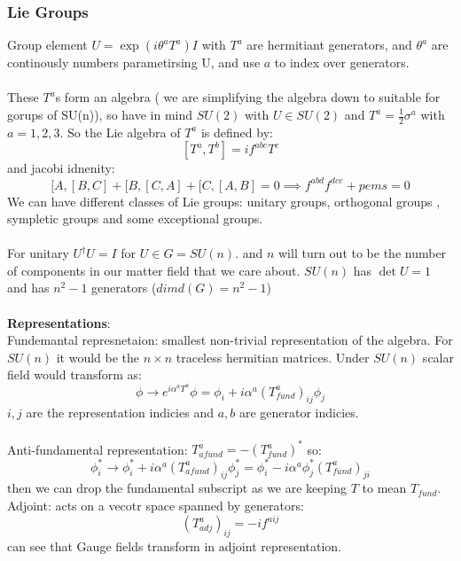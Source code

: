 \documentclass{article}
\begin{document}
\subsubsection{Lie Groups}
       Group element $U = \exp ( i \theta^a T^a) I$ with $T^a$ are hermitiant generators, and $\theta^a$ are continously numbers parametirsing U, and use $a$ to index over generators.\\\\
       These $T^a$s form an algebra ( we are simplifying the algebra down to suitable for gorups of SU(n)), so have in mind $SU(2)$ with $U \in SU(2)$ and $T^a = \frac{1}{2} \sigma^a$ with $a = 1,2,3$. So the Lie algebra of $T^a$ is defined by:
       $$
        [T^a, T^b] = i f^{abc} T^c
       $$
       and jacobi idnenity:
       $$
       [ A, [B,C] + [ B, [C,A] + [ C, [A, B] = 0 \implies f^{abd} f^{dc e} + pems = 0
       $$
       We can have different classes of Lie groups: unitary groups, orthogonal groups , sympletic groups and some exceptional groups.\\\\
       For unitary $U^{\dagger} U = I$ for $U \in G = SU(n)$. and $n$ will turn out to be the number of components in our matter field that we care about. $SU(n)$ has $\det U = 1$ and has $n^2 -1$ generators  ($dim d(G) = n^2 -1$)\\\\
       \textbf{Representations}:\\
       Fundemantal represnetaion: smallest non-trivial representation of the algebra. For $SU(n)$ it would be the $n \times n$ traceless hermitian matrices. Under $SU(n)$ scalar field would transform as:
       $$
       \phi \rightarrow e^{i \alpha^a T^a} \phi = \phi_i + i \alpha^a (T^a_{fund})_{ij} \phi_j
       $$
       $i,j$ are the representation indicies and $a,b$ are generator indicies.\\\\
       Anti-fundamental representation: $T_{afund}^a = - ( T_{fund}^a)^*$ so:
       $$
        \phi^*_i \rightarrow \phi_i^* + i \alpha^a(T^a_{afund})_{ij} \phi_j^* = \phi_i^* - i \alpha^a \phi_j^* ( T_{fund}^a)_{ji}
       $$
       then we can drop the fundamental subscript as we are keeping $T$ to mean $T_{fund}$.\\
       Adjoint: acts on a vecotr space spanned by generators:
       $$
        ( T_{adj}^a) _{ij} =- if^{aij}
       $$
        can see that Gauge fields transform in adjoint representation.
\end{document}
